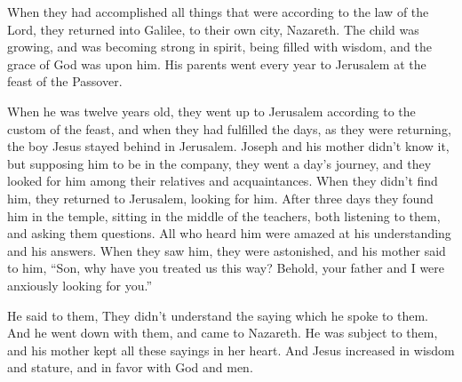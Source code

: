 {\par }{\PP {}When they had accomplished all things that were according to the law of the Lord, they returned into Galilee, to their own city, Nazareth.
The child was growing, and was becoming strong in spirit, being filled with wisdom, and the grace of God was upon him.
His parents went every year to Jerusalem at the feast of the Passover.
\par }{\PP {}When he was twelve years old, they went up to Jerusalem according to the custom of the feast,
and when they had fulfilled the days, as they were returning, the boy Jesus stayed behind in Jerusalem. Joseph and his mother didn’t know it,
but supposing him to be in the company, they went a day’s journey, and they looked for him among their relatives and acquaintances.
When they didn’t find him, they returned to Jerusalem, looking for him.
After three days they found him in the temple, sitting in the middle of the teachers, both listening to them, and asking them questions.
All who heard him were amazed at his understanding and his answers.
When they saw him, they were astonished, and his mother said to him, “Son, why have you treated us this way? Behold, your father and I were anxiously looking for you.”
\par }{\PP {}He said to them,
{}
They didn’t understand the saying which he spoke to them.
And he went down with them, and came to Nazareth. He was subject to them, and his mother kept all these sayings in her heart.
And Jesus increased in wisdom and stature, and in favor with God and men.

}
